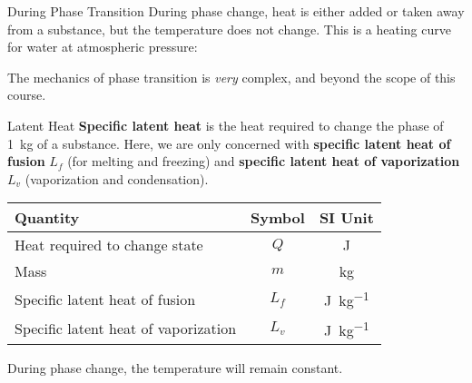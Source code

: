 \documentclass[12pt,aspectratio=169,dvipsnames]{beamer}
\begin{document}
\begin{frame}{During Phase Transition}
  During phase change, heat is either added or taken away from a substance, but
  the temperature does not change. This is a heating curve for water at
  atmospheric pressure:
  \begin{center}
  \end{center}
  The mechanics of phase transition is \emph{very} complex, and beyond the
  scope of this course.
\end{frame}



\begin{frame}{Latent Heat}
  \textbf{Specific latent heat} is the heat required to change the phase of
  \SI{1}{\kilo\gram} of a substance. Here, we are only concerned with
  \textbf{specific latent heat of fusion} $L_f$ (for melting and freezing) and
  \textbf{specific latent heat of vaporization} $L_v$ (vaporization and
  condensation).
  
  \begin{center}
    \begin{tabular}{l|c|c}
      \rowcolor{pink}
      \textbf{Quantity} & \textbf{Symbol} & \textbf{SI Unit} \\ \hline
      Heat required to change state & $Q$ & \si\joule \\
      Mass                          & $m$ & \si{\kilo\gram} \\
      Specific latent heat of fusion & $L_f$ & \si{\joule\per\kilo\gram} \\
      Specific latent heat of vaporization & $L_v$ & \si{\joule\per\kilo\gram}
    \end{tabular}
  \end{center}
  During phase change, the temperature will remain constant.
\end{frame}
\end{document}
